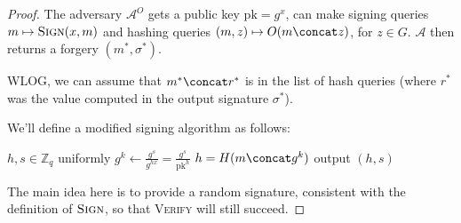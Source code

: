 \documentclass[12pt]{tufte-book}
\begin{document}
\begin{proof}
    The adversary $\mathcal{A}^O$ gets a public key $\mathrm{pk} = g^x$, can make signing queries $m \mapsto \textsc{Sign}(x, m)$ and hashing queries $(m, z) \mapsto O(m \concat z)$, for $z \in G$. $\mathcal{A}$ then returns a forgery $(m^*, \sigma^*)$.
    \begin{center}
    \end{center}

    WLOG, we can assume that $m^* \concat r^*$ is in the list of hash queries (where $r^*$ was the value computed in the output signature $\sigma^*$).

    We'll define a modified signing algorithm as follows:
    \begin{algorithmic}
        \State $h, s \in \mathbb{Z}_q$ uniformly
        \State $g^k \gets \frac{g^s}{g^{hx}} = \frac{g^s}{\mathrm{pk}^h}$
        \State $h = H(m \concat g^k)$
        \State output $(h, s)$
        \EndFunction
    \end{algorithmic}
    The main idea here is to provide a random signature, consistent with the definition of $\textsc{Sign}$, so that \textsc{Verify} will still succeed.


\end{proof}
\end{document}
